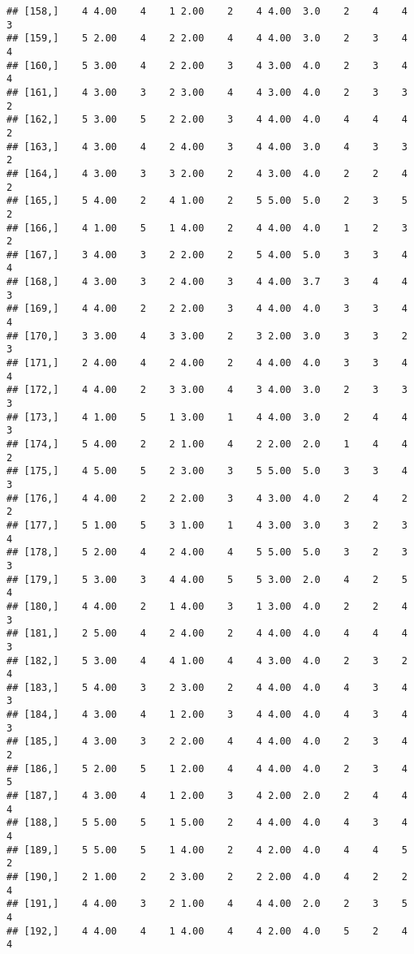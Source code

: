 \documentclass[]{article}
\begin{document}
\begin{verbatim}
## [158,]    4 4.00    4    1 2.00    2    4 4.00  3.0    2    4    4    3
## [159,]    5 2.00    4    2 2.00    4    4 4.00  3.0    2    3    4    4
## [160,]    5 3.00    4    2 2.00    3    4 3.00  4.0    2    3    4    4
## [161,]    4 3.00    3    2 3.00    4    4 3.00  4.0    2    3    3    2
## [162,]    5 3.00    5    2 2.00    3    4 4.00  4.0    4    4    4    2
## [163,]    4 3.00    4    2 4.00    3    4 4.00  3.0    4    3    3    2
## [164,]    4 3.00    3    3 2.00    2    4 3.00  4.0    2    2    4    2
## [165,]    5 4.00    2    4 1.00    2    5 5.00  5.0    2    3    5    2
## [166,]    4 1.00    5    1 4.00    2    4 4.00  4.0    1    2    3    2
## [167,]    3 4.00    3    2 2.00    2    5 4.00  5.0    3    3    4    4
## [168,]    4 3.00    3    2 4.00    3    4 4.00  3.7    3    4    4    3
## [169,]    4 4.00    2    2 2.00    3    4 4.00  4.0    3    3    4    4
## [170,]    3 3.00    4    3 3.00    2    3 2.00  3.0    3    3    2    3
## [171,]    2 4.00    4    2 4.00    2    4 4.00  4.0    3    3    4    4
## [172,]    4 4.00    2    3 3.00    4    3 4.00  3.0    2    3    3    3
## [173,]    4 1.00    5    1 3.00    1    4 4.00  3.0    2    4    4    3
## [174,]    5 4.00    2    2 1.00    4    2 2.00  2.0    1    4    4    2
## [175,]    4 5.00    5    2 3.00    3    5 5.00  5.0    3    3    4    3
## [176,]    4 4.00    2    2 2.00    3    4 3.00  4.0    2    4    2    2
## [177,]    5 1.00    5    3 1.00    1    4 3.00  3.0    3    2    3    4
## [178,]    5 2.00    4    2 4.00    4    5 5.00  5.0    3    2    3    3
## [179,]    5 3.00    3    4 4.00    5    5 3.00  2.0    4    2    5    4
## [180,]    4 4.00    2    1 4.00    3    1 3.00  4.0    2    2    4    3
## [181,]    2 5.00    4    2 4.00    2    4 4.00  4.0    4    4    4    3
## [182,]    5 3.00    4    4 1.00    4    4 3.00  4.0    2    3    2    4
## [183,]    5 4.00    3    2 3.00    2    4 4.00  4.0    4    3    4    3
## [184,]    4 3.00    4    1 2.00    3    4 4.00  4.0    4    3    4    3
## [185,]    4 3.00    3    2 2.00    4    4 4.00  4.0    2    3    4    2
## [186,]    5 2.00    5    1 2.00    4    4 4.00  4.0    2    3    4    5
## [187,]    4 3.00    4    1 2.00    3    4 2.00  2.0    2    4    4    4
## [188,]    5 5.00    5    1 5.00    2    4 4.00  4.0    4    3    4    4
## [189,]    5 5.00    5    1 4.00    2    4 2.00  4.0    4    4    5    2
## [190,]    2 1.00    2    2 3.00    2    2 2.00  4.0    4    2    2    4
## [191,]    4 4.00    3    2 1.00    4    4 4.00  2.0    2    3    5    4
## [192,]    4 4.00    4    1 4.00    4    4 2.00  4.0    5    2    4    4

\end{verbatim}
\end{document}
